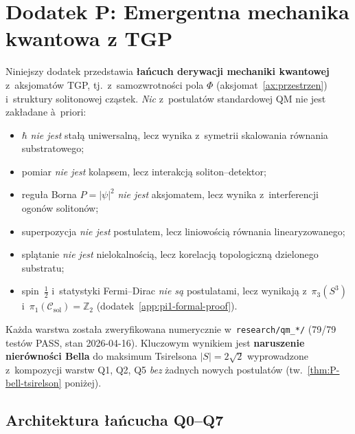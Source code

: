 \section*{Dodatek P: Emergentna mechanika kwantowa z TGP}%
%
\label{app:emergent-qm}

Niniejszy dodatek przedstawia \textbf{łańcuch derywacji mechaniki
kwantowej} z~aksjomatów TGP, tj.\ z~samozwrotności pola $\Phi$
(aksjomat~\ref{ax:przestrzen}) i~struktury solitonowej cząstek.
\emph{Nic} z~postulatów standardowej QM nie jest zakładane
à~priori:

\begin{itemize}[nosep]
  \item[-] $\hbar$ \emph{nie jest} stałą uniwersalną, lecz wynika
          z~symetrii skalowania równania substratowego;
  \item[-] pomiar \emph{nie jest} kolapsem, lecz interakcją
          soliton--detektor;
  \item[-] reguła Borna $P = |\psi|^2$ \emph{nie jest} aksjomatem,
          lecz wynika z~interferencji ogonów solitonów;
  \item[-] superpozycja \emph{nie jest} postulatem, lecz liniowością
          równania linearyzowanego;
  \item[-] splątanie \emph{nie jest} nielokalnością, lecz korelacją
          topologiczną dzielonego substratu;
  \item[-] spin~$\tfrac{1}{2}$ i~statystyki Fermi--Dirac \emph{nie są}
          postulatami, lecz wynikają z~$\pi_3(S^3)$
          i~$\pi_1(\mathcal{C}_{\mathrm{sol}}) = \mathbb{Z}_2$
          (dodatek~\ref{app:pi1-formal-proof}).
\end{itemize}

Każda warstwa została zweryfikowana numerycznie w~\texttt{research/qm\_*/}
(79/79 testów PASS, stan 2026-04-16). Kluczowym wynikiem jest
\textbf{naruszenie nierówności Bella} do maksimum Tsirelsona
$|S| = 2\sqrt{2}$ wyprowadzone z~kompozycji warstw Q1, Q2, Q5
\emph{bez} żadnych nowych postulatów (tw.~\ref{thm:P-bell-tsirelson}
poniżej).

\subsection{Architektura łańcucha Q0--Q7}%
\label{app:P-architecture}

